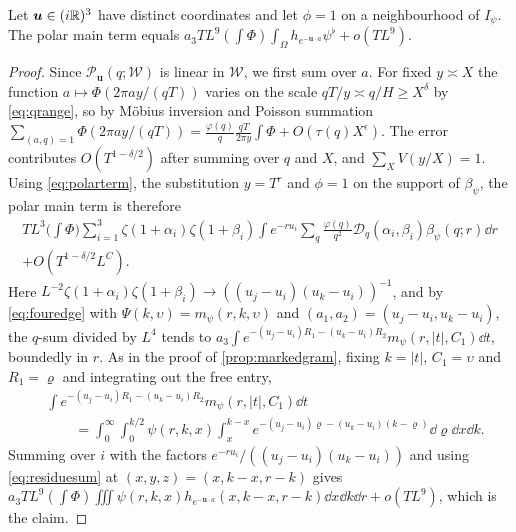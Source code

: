 \documentclass[11pt,colorlinks]{charlie}
\newcommand{\Om}{\Omega}
\begin{document}
\begin{lemma}\label{lem:polarlimit}
Let $\boldsymbol u\in(i\mathbb{R})^3$ have distinct coordinates and let $\phi=1$ on a neighbourhood of $I_\psi$. The polar main term equals $a_3TL^9(\int\Phi)\int_\Om h_{e^{-\boldsymbol u\cdot a}}\psi^\flat+o(TL^9)$.
\end{lemma}
\begin{proof}
Since $\mathcal P_{\boldsymbol u}(q;\mathcal W)$ is linear in $\mathcal W$, we first sum over $a$. For fixed $y\asymp X$ the function $a\mapsto\Phi(2\pi ay/(qT))$ varies on the scale $qT/y\asymp q/H\ge X^\delta$ by \eqref{eq:qrange}, so by M\"obius inversion and Poisson summation $\sum_{(a,q)=1}\Phi(2\pi ay/(qT))=\frac{\varphi(q)}q\frac{qT}{2\pi y}\int\Phi+O(\tau(q)X^\epsilon)$. The error contributes $O(T^{1-\delta/2})$ after summing over $q$ and $X$, and $\sum_XV(y/X)=1$. Using \eqref{eq:polarterm}, the substitution $y=T^r$ and $\phi=1$ on the support of $\beta_\psi$, the polar main term is therefore
\begin{multline*}
 TL^3\Big(\int\Phi\Big)\sum_{i=1}^3\zeta(1+\alpha_i)\zeta(1+\beta_i)\int\!e^{-ru_i}\sum_q\frac{\varphi(q)}{q^2}\mathcal D_q(\alpha_i,\beta_i)\beta_\psi(q;r)\dd r\\
 +O(T^{1-\delta/2}L^C).
\end{multline*}
Here $L^{-2}\zeta(1+\alpha_i)\zeta(1+\beta_i)\to((u_j-u_i)(u_k-u_i))^{-1}$, and by \eqref{eq:fouredge} with $\Psi(k,\upsilon)=m_\psi(r,k,\upsilon)$ and $(a_1,a_2)=(u_j-u_i,u_k-u_i)$, the $q$-sum divided by $L^4$ tends to $a_3\int e^{-(u_j-u_i)R_1-(u_k-u_i)R_2}m_\psi(r,|t|,C_1)\dd t$, boundedly in $r$. As in the proof of \cref{prop:markedgram}, fixing $k=|t|$, $C_1=\upsilon$ and $R_1=\varrho$ and integrating out the free entry,
\[
 \begin{split}
 &\int e^{-(u_j-u_i)R_1-(u_k-u_i)R_2}m_\psi(r,|t|,C_1)\dd t\\
 &\qquad=\int_0^\infty\!\!\int_0^{k/2}\psi(r,k,x)\int_x^{k-x}e^{-(u_j-u_i)\varrho-(u_k-u_i)(k-\varrho)}\dd\varrho\dd x\dd k .
 \end{split}
\]
Summing over $i$ with the factors $e^{-ru_i}/((u_j-u_i)(u_k-u_i))$ and using \eqref{eq:residuesum} at $(x,y,z)=(x,k-x,r-k)$ gives $a_3TL^9(\int\Phi)\iiint\psi(r,k,x)h_{e^{-\boldsymbol u\cdot a}}(x,k-x,r-k)\dd x\dd k\dd r+o(TL^9)$, which is the claim.
\end{proof}
\end{document}
